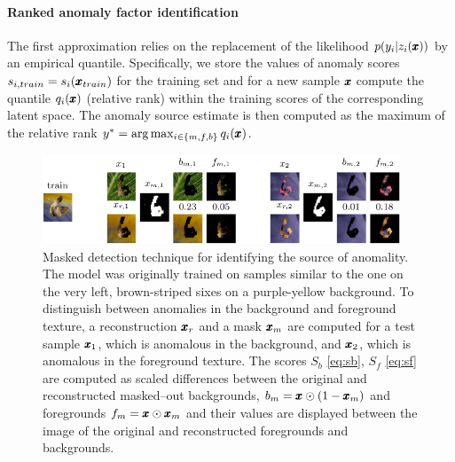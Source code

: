 \paragraph{Ranked anomaly factor identification}
The first approximation relies on the replacement of the likelihood $p(y_i\vert z_i(\pmb{{x}}))$ by an empirical quantile.  Specifically, we store the values of anomaly scores $s_{i,train}=s_i(\pmb{{x}}_{train})$ for the training set and for a new sample $\pmb{{x}}$ compute the quantile $q_i(\pmb{{x}})$ (relative rank) within the training scores of the corresponding latent space. The anomaly source estimate is then computed as the maximum of the relative rank $y^* = \arg\max_{i\in\{m,f,b\}}q_i(\pmb{{x}})$.

\begin{figure}
    \centering
    \includegraphics[width=0.95\textwidth]{data/chapter_sgvaegan/fig4_masked_examples.pdf}
    \caption{Masked detection technique for identifying the source of anomality. The model was originally trained on samples similar to the one on the very left, brown-striped sixes on a purple-yellow background. To distinguish between anomalies in the background and foreground texture, a reconstruction $\pmb{{x}}_r$ and a mask $\pmb{{x}}_m$ are computed for a test sample $\pmb{{x}}_1$, which is anomalous in the background, and $\pmb{{x}}_2$, which is anomalous in the foreground texture. The scores $S_b$ \eqref{eq:sb}, $S_f$ \eqref{eq:sf} are computed as scaled differences between the original and reconstructed masked--out backgrounds, $b_m = \pmb{{x}} \odot (1-\pmb{{x}}_m)$ and foregrounds $f_m = \pmb{{x}} \odot \pmb{{x}}_m$ and their values are displayed between the image of the original and reconstructed foregrounds and backgrounds.}
    \label{fig:masked_detection}
\end{figure}

